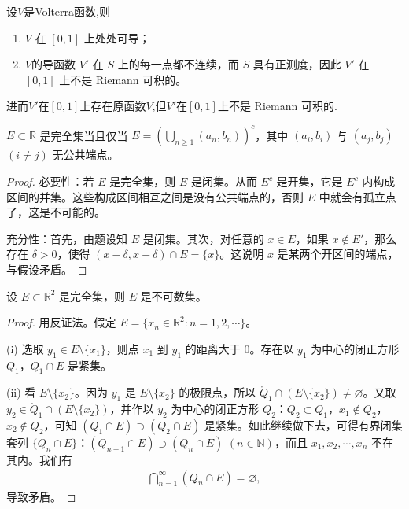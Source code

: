 \documentclass[../../main.tex]{subfiles}%
\begin{document}
\begin{theorem}[Volterra函数的基本性质]\label{theorem:Volterra函数的基本性质}
设$V$是Volterra函数,则
\begin{enumerate}[(1)]
\item \( V \) 在 \( [0,1] \) 上处处可导；
\item \( V \)的导函数 \( V' \) 在 \( S \) 上的每一点都不连续，而 \( S \) 具有正测度，因此 \( V' \) 在 \( [0,1] \) 上不是 Riemann 可积的。
\end{enumerate}
进而$V'$在$[0,1]$上存在原函数$V$,但$V'$在$[0,1]$上不是 Riemann 可积的.
\end{theorem}

\begin{example}
\(E\subset\mathbb{R}\) 是完全集当且仅当 \(E = \left(\bigcup_{n\geqslant 1}(a_n,b_n)\right)^c\)，其中 \((a_i,b_i)\) 与 \((a_j,b_j)\) \((i\neq j)\) 无公共端点。
\end{example}
\begin{proof}

{\heiti 必要性：}若 \(E\) 是完全集，则 \(E\) 是闭集。从而 \(E^c\) 是开集，它是 \(E^c\) 内构成区间的并集。这些构成区间相互之间是没有公共端点的，否则 \(E\) 中就会有孤立点了，这是不可能的。

{\heiti 充分性：}首先，由题设知 \(E\) 是闭集。其次，对任意的 \(x\in E\)，如果 \(x\notin E'\)，那么存在 \(\delta>0\)，使得 \((x - \delta,x + \delta)\cap E = \{x\}\)。这说明 \(x\) 是某两个开区间的端点，与假设矛盾。

\end{proof}

\begin{example}
设 \(E\subset\mathbb{R}^2\) 是完全集，则 \(E\) 是不可数集。
\end{example}
\begin{proof}

用反证法。假定 \(E = \{x_n\in\mathbb{R}^2: n = 1,2,\cdots\}\)。

(i) 选取 \(y_1\in E\setminus\{x_1\}\)，则点 \(x_1\) 到 \(y_1\) 的距离大于 \(0\)。存在以 \(y_1\) 为中心的闭正方形 \(Q_1\)，\(Q_1\cap E\) 是紧集。

(ii) 看 \(E\setminus\{x_2\}\)。因为 \(y_1\) 是 \(E\setminus\{x_2\}\) 的极限点，所以 \(\mathring{Q}_1\cap (E\setminus\{x_2\})\neq\varnothing\)。又取 \(y_2\in\mathring{Q}_1\cap (E\setminus\{x_2\})\)，并作以 \(y_2\) 为中心的闭正方形 \(Q_2\)：\(Q_2\subset Q_1\)，\(x_1\notin Q_2\)，\(x_2\notin Q_2\)，可知 \((Q_1\cap E)\supset (Q_2\cap E)\) 是紧集。如此继续做下去，可得有界闭集套列 \(\{Q_n\cap E\}\)：\((Q_{n - 1}\cap E)\supset (Q_n\cap E)\) \((n\in\mathbb{N})\)，而且 \(x_1,x_2,\cdots,x_n\) 不在其内。我们有
\begin{align*}
\bigcap_{n = 1}^{\infty}(Q_n\cap E)=\varnothing,
\end{align*}
导致矛盾。 

\end{proof}
\end{document}
